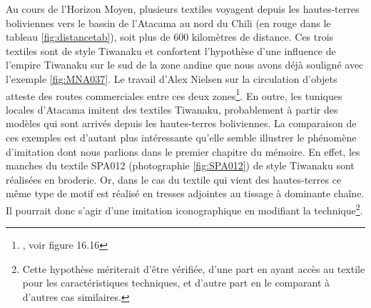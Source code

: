 Au cours de l'Horizon Moyen, plusieurs textiles voyagent depuis les hautes-terres boliviennes vers le bassin de l'Atacama au nord du Chili (en rouge dans le tableau \ref{fig:distancetab}), soit plus de 600 kilomètres de distance. Ces trois textiles sont de style Tiwanaku et confortent l'hypothèse d'une influence de l'empire Tiwanaku sur le sud de la zone andine que nous avons déjà souligné avec l'exemple \ref{fig:MNA037}. Le travail d'Alex Nielsen sur la circulation d'objets atteste des routes commerciales entre ces deux zones\footnote{\cite[p.~407]{nielsenCirculatingObjectsConstitution2013}, voir figure 16.16}. En outre, les tuniques locales d'Atacama imitent des textiles Tiwanaku, probablement à partir des modèles qui sont arrivés depuis les hautes-terres boliviennes. La comparaison de ces exemples est d'autant plus intéressante qu'elle semble illustrer le phénomène d'imitation dont nous parlions dans le premier chapitre du mémoire. En effet, les manches du textile SPA012 (photographie \ref{fig:SPA012}) de style Tiwanaku sont réalisées en broderie. Or, dans le cas du textile qui vient des hautes-terres ce même type de motif est réalisé en tresses adjointes au tissage à dominante chaîne. %
Il pourrait donc s'agir d'une imitation iconographique en modifiant la technique\footnote{Cette hypothèse mériterait d'être vérifiée, d'une part en ayant accès au textile pour les caractéristiques techniques, et d'autre part en le comparant à d'autres cas similaires.}.

